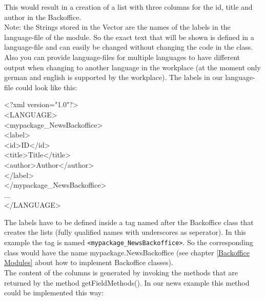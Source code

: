This would result in a creation of a list with three columns for the id,
title and author in the Backoffice.\\
Note: the Strings stored in the Vector
are the names of the labels in the language-file of the module. So the exact
text that will be shown is defined in a language-file and can easily be 
changed without changing the code in the class. Also you can provide language-files
for multiple languages to have different output when changing to another language in
the workplace (at the moment only german and english is supported by the workplace).
The labels in our language-file could look like this:

\begin{xml}
<?xml version="1.0"?>\\
<LANGUAGE>\\
\xtaba		<mypackage\_NewsBackoffice>\\		
\\
\xtabc				<id>ID</id>\\
\xtabc				<title>Title</title>\\
\xtabc				<author>Author</author>\\
\xtabb			</label>\\
\xtaba		</mypackage\_NewsBackoffice>\\
\xtaba		...\\
</LANGUAGE>\\		
\end{xml}

The labels have to be defined inside a tag named after the Backoffice class that
creates the lists (fully qualified names with underscores as seperator).
In this example the tag is named \texttt{<mypackage\_NewsBackoffice>}. So the corresponding
class would have the name {\class mypackage.NewsBackoffice} (see chapter \ref{Backoffice Modules} 
about how to implement Backoffice classes).\\
The content of the columns is generated by invoking the methods that are returned
by the method {\meth getFieldMethods()}. In our news example this method could be implemented
this way:

